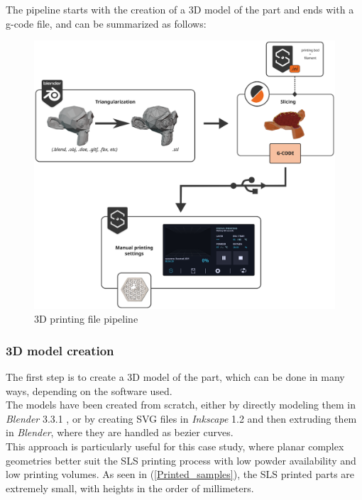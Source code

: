 \documentclass{article}
\begin{document}
        The pipeline starts with the creation of a 3D model of the part and ends with a g-code file, and can 
        be summarized as follows: 
        
                \begin{figure}[h!]
                    \centering 
                    \includegraphics[width=\textwidth]{Pictures/3dprint_file_pipeline_scheme.eps}
                    \caption{3D printing file pipeline}
                    \label{fig:3dprint_file_pipeline_scheme}
                \end{figure}

        \subsubsection{3D model creation\label{3D_model_creation}}

        The first step is to create a 3D model of the part, which can be done in many ways, 
        depending on the software used. \\

        The models have been created from scratch, either by directly modeling them in \textit{Blender} 3.3.1 \autocites{Blender},
        or by creating SVG files in \textit{Inkscape} 1.2 \autocites{Inkscape} and then extruding them in \textit{Blender}, where
        they are handled as bezier curves. \\

        This approach is particularly useful for this case study, where planar complex geometries better suit the SLS printing process
        with low powder availability and low printing volumes. As seen in (\ref{Printed_samples}), the SLS printed parts 
        are extremely small, with heights in the order of millimeters. \\
        
\end{document}
